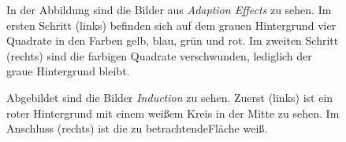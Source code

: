 \documentclass[11pt]{article}
\begin{document}
\begin{figure}[H]
\caption{In der Abbildung sind die Bilder aus \textit{Adaption Effects} zu sehen. Im ersten Schritt (links) befinden sich auf dem grauen Hintergrund vier Quadrate in den Farben gelb, blau, grün und rot. Im zweiten Schritt (rechts) sind die farbigen Quadrate verschwunden, lediglich der graue Hintergrund bleibt.}
\label{4farben}
\end{figure}


\begin{figure}[H]
\caption{Abgebildet sind die Bilder \textit{Induction} zu sehen. Zuerst (links) ist ein roter Hintergrund mit einem weißem Kreis in der Mitte zu sehen. Im Anschluss (rechts) ist die zu betrachtendeFläche weiß.}
\label{induction}
\end{figure}
\end{document}
